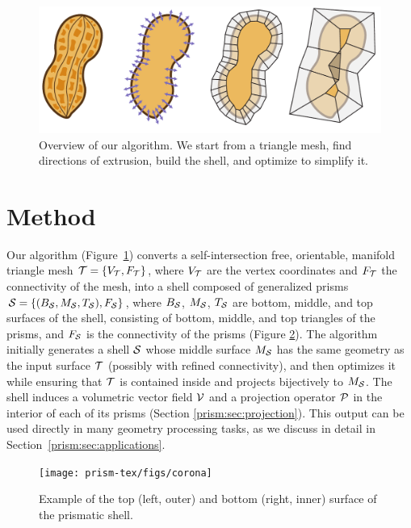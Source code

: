 \begin{figure}
    \centering
    \includegraphics[width=\linewidth]{prism-tex/figs/pipeline}
    \caption{Overview of our algorithm. We start from a triangle mesh, find directions of extrusion, build the shell, and optimize to simplify it.}
    \label{prism:fig:pipeline}
    
\end{figure}


\section{Method}\label{prism:sec:method}
Our algorithm (Figure~\ref{prism:fig:pipeline}) converts a self-intersection free, orientable, manifold triangle mesh $\T = \{V_\T,F_\T\}$, where $V_\T$ are the vertex coordinates and
$F_\T$ the connectivity of the mesh, into a shell composed of generalized prisms $\S = \{(B_\S,M_\S,T_\S),F_\S\}$, where $B_\S$, $M_\S$, $T_\S$ are bottom, middle, and top surfaces of the shell, 
consisting of bottom, middle, and top  triangles of the prisms,
and $F_\S$  is the connectivity of the prisms (Figure \ref{prism:fig:corona}).
The algorithm initially generates a shell $\S$ whose middle surface $M_\S$ has the same geometry as the input surface $\T$ (possibly with refined connectivity),
and then optimizes it while ensuring that $\T$ is contained inside and projects bijectively to $M_\S$. The shell induces a volumetric vector field $\V$ and a projection operator $\P$ in the interior of each of its prisms (Section \ref{prism:sec:projection}). This output can be used directly in many geometry processing tasks, as we discuss in detail in Section~\ref{prism:sec:applications}.

\begin{figure}
    \centering
    \texttt{[image: prism-tex/figs/corona]}
    \caption{Example of the top (left, outer) and bottom (right, inner) surface of the prismatic shell.}
    
    \label{prism:fig:corona}
\end{figure}


